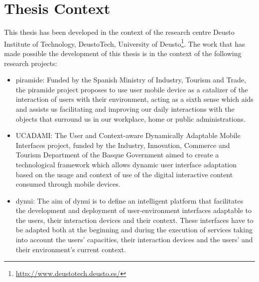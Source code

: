 
\section{Thesis Context}
\label{sec:thesis_context}

This thesis has been developed in the context of the research centre Deusto
Institute of Technology, DeustoTech, University of Deusto\footnote{\url{http://www.deustotech.deusto.es/}}.
The work that has made possible the development of this thesis is in the context 
of the following research projects:

\begin{itemize}
  \item \acs{piramide}: Funded by the Spanish Ministry of Industry, Tourism and 
  Trade, the \ac{piramide} project proposes to use user mobile device as a 
  catalizer of the interaction of users with their environment, acting as a 
  sixth sense which aids and assists us facilitating and improving our daily 
  interactions with the objects that surround us in our workplace, home or 
  public administrations.
  
  \item UCADAMI: The User and Context-aware Dynamically Adaptable Mobile 
  Interfaces project, funded by the Industry, Innovation, Commerce and Tourism 
  Department of the Basque Government aimed to create a technological framework
  which allows dynamic user interface adaptation based on the usage and context of
  use of the digital interactive content consumed through mobile devices.
  
  \item \acs{dynui}: The aim of \ac{dynui} is to define an intelligent 
  platform that facilitates the development and deployment of user-environment 
  interfaces adaptable to the users, their interaction devices and their 
  context. These interfaces have to be adapted both at the beginning and 
  during the execution of services taking into account the users' capacities, 
  their interaction devices and the users' and their environment's current 
  context.
 
\end{itemize}






